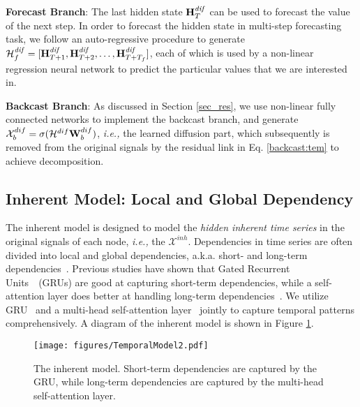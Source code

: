 \documentclass[sigconf, nonacm]{acmart}
\def\b#1{\mathbf{#1}}
\def\cal#1{\mathcal{#1}}
\newcommand{\ie}{\textit{i.e.,}\xspace}
\begin{document}
\noindent\textbf{Forecast Branch}: The last hidden state $\b{H}_T^{\mathit{\color{black}dif}}$ can be used to forecast the value of the next step. 
In order to forecast the hidden state in multi-step forecasting task, we follow an auto-regressive procedure to generate ${\color{black}\cal{H}^{\mathit{\color{black}dif}}_f} = [\b{H}_{T+1}^{\mathit{\color{black}dif}}, \b{H}_{T+2}^{\mathit{\color{black}dif}}, \dots, \b{H}_{T+T_f}^{\mathit{\color{black}dif}}]$, each of which is used by a non-linear regression neural network to predict the particular values that we are interested in. 

\noindent\textbf{Backcast Branch}: 
{\color{black}
As discussed in Section \ref{sec_res}, we use non-linear fully connected networks to implement the backcast branch, and generate $\mathcal{X}_b^{\color{black}dif}=\sigma(\cal{H}^{\color{black}dif}\b{W}_{b}^{\color{black}dif})$, \ie the learned {\color{black}diffusion} part, which subsequently is removed from the original signals by the residual link in Eq. \ref{backcast:tem} to achieve decomposition.}
 \subsection{{\color{black}Inherent} Model: Local and Global Dependency}
The {\color{black}inherent model is designed to model the \textit{hidden inherent time series} in the original signals of each node, \ie the $\mathcal{X}^{inh}$}. 
Dependencies in time series are often divided into local and global dependencies, a.k.a. short- and long-term dependencies~\cite{2020STGNN, 2020NBeats, TrendPeriodic}.
Previous studies have shown that Gated Recurrent Units~\cite{2014GRU}~(GRUs) are good at capturing short-term dependencies, while a self-attention layer does better at handling long-term dependencies~\cite{2020STGNN}.
We utilize GRU~\cite{2014GRU} and a multi-head self-attention layer~\cite{2017Transformer} jointly to capture temporal patterns comprehensively.
A diagram of the {\color{black}inherent} model is shown in Figure \ref{temporal}.
\begin{figure}[h]
  \setlength{\abovecaptionskip}{0.2cm}
\centering
  \texttt{[image: figures/TemporalModel2.pdf]}
  \caption{The {\color{black}inherent} model. Short-term dependencies are captured by the GRU, while long-term dependencies are captured by the multi-head self-attention layer.}
  \label{temporal}
\end{figure}
\end{document}
